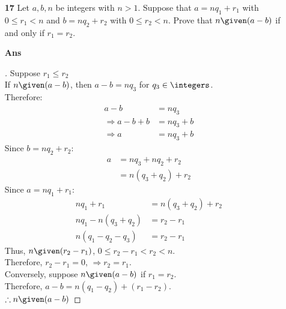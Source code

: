 \documentclass[paper=usletter, fontsize=12pt]{article}
\begin{document}
\begin{itemize}
\begin{itemize}
            \item[\textbf{17}] Let $a, b, n$ be integers with $n > 1$.
            Suppose that $a = nq_1 + r_1$ with $0 \le r_1 < n$ and $b =
            nq_2 + r_2$ with $0 \le r_2 < n$. Prove that $n \given (a - b)$
            if and only if $r_1 = r_2$.
            \item[\textbf{Ans}]
            \begin{proof}[\unskip\nopunct]
                Suppose $r_1 \le r_2$ \\
                If $n \given (a - b)$, then $a - b = nq_3$ for $q_3 \in
                \integers$. \\
                Therefore:
                \begin{align*}
                    a - b & = nq_3 \\
                    \Rightarrow a - b + b & = nq_3 + b \\
                    \Rightarrow a & = nq_3 + b
                \end{align*}
                Since $b = nq_2 + r_2$:
                \begin{align*}
                    a & = nq_3 + nq_2 + r_2 \\
                    & = n(q_3 + q_2) + r_2
                \end{align*}
                Since $a = nq_1 + r_1$:
                \begin{align*}
                    nq_1 + r_1 & = n(q_3 + q_2) + r_2 \\
                    nq_1 - n(q_3 + q_2) & = r_2 - r_1 \\
                    n(q_1 - q_2 - q_3) & = r_2 - r_1
                \end{align*}
                Thus, $n \given (r_2 - r_1)$, $0 \le r_2 - r_1 < r_2 < n$.
                \\
                Therefore, $r_2 - r_1 = 0$, $\Rightarrow r_2 = r_1$. \\
                Conversely, suppose $n \given (a - b)$ if $r_1 = r_2$. \\
                Therefore, $a - b = n(q_1 - q_2) + (r_1 - r_2)$. \\
                $\therefore n \given (a-b)$ \qedhere
            \end{proof}
            \vspace{0.2in}


\end{itemize}
\end{itemize}
\end{document}
